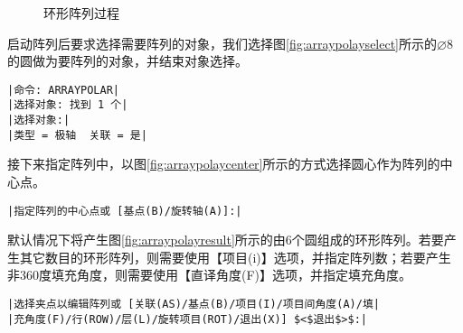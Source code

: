 \begin{procedure}
\begin{figure}[htbp]
\centering
{}\hspace{20pt}
\hspace{20pt}
\caption{环形阵列过程}
\end{figure}

启动阵列后要求选择需要阵列的对象，我们选择图\ref{fig:arraypolayselect}所示的$\diameter 8$的圆做为要阵列的对象，并结束对象选择。
\begin{lstlisting}
|命令: ARRAYPOLAR|
|选择对象: 找到 1 个|
|选择对象:|
|类型 = 极轴  关联 = 是|
\end{lstlisting}
接下来指定阵列中，以图\ref{fig:arraypolaycenter}所示的方式选择圆心作为阵列的中心点。
\begin{lstlisting}
|指定阵列的中心点或 [基点(B)/旋转轴(A)]:|
\end{lstlisting}
默认情况下将产生图\ref{fig:arraypolayresult}所示的由6个圆组成的环形阵列。若要产生其它数目的环形阵列，则需要使用【项目(i)】选项，并指定阵列数；若要产生非360度填充角度，则需要使用【直译角度(F)】选项，并指定填充角度。
\begin{lstlisting}
|选择夹点以编辑阵列或 [关联(AS)/基点(B)/项目(I)/项目间角度(A)/填|
|充角度(F)/行(ROW)/层(L)/旋转项目(ROT)/退出(X)] $<$退出$>$:|
\end{lstlisting}
\end{procedure}
\endinput